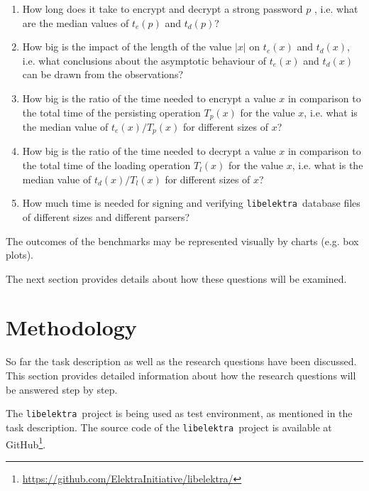 \documentclass[a4paper,12pt]{article}
\newcommand{\libelektra}{\texttt{libelektra}~}
\begin{document}
\begin{enumerate}
\item How long does it take to encrypt and decrypt a strong password $p$ \cite{5461951,Holt:2011:IRS:2047456.2047461}, i.e. what are the median values of $t_e(p)$ and $t_d(p)$?

\item How big is the impact of the length of the value $|x|$ on $t_e(x)$ and $t_d(x)$, i.e. what conclusions about the asymptotic behaviour of $t_e(x)$ and $t_d(x)$ can be drawn from the observations?

\item How big is the ratio of the time needed to encrypt a value $x$ in comparison to the total time of the persisting operation $T_p(x)$ for the value $x$, i.e. what is the median value of $t_e(x)/T_p(x)$ for different sizes of $x$?

\item How big is the ratio of the time needed to decrypt a value $x$ in comparison to the total time of the loading operation $T_l(x)$ for the value $x$, i.e. what is the median value of $t_d(x)/T_l(x)$ for different sizes of $x$?

\item How much time is needed for signing and verifying \libelektra database files of different sizes and different parsers?

\end{enumerate}

The outcomes of the benchmarks may be represented visually by charts (e.g. box plots).

The next section provides details about how these questions will be examined.


\section{Methodology}

So far the task description as well as the research questions have been discussed.
This section provides detailed information about how the research questions will be answered step by step.

The \libelektra project is being used as test environment, as mentioned in the task description.
The source code of the \libelektra project is available at GitHub\footnote{\url{https://github.com/ElektraInitiative/libelektra/}}.
\end{document}
